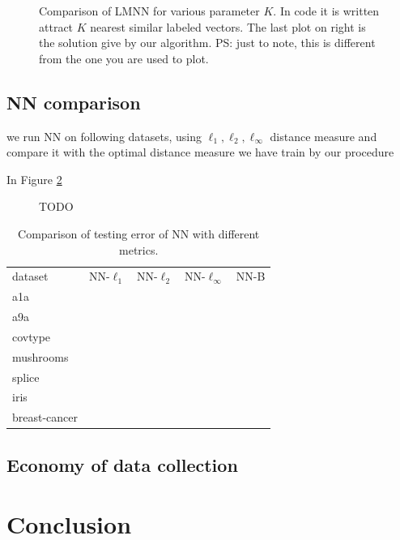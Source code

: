 \documentclass{article}
\begin{document}
\begin{figure}[h!]
\caption{Comparison of LMNN for various parameter $K$.
In code it is written 
 attract $K$ nearest similar labeled vectors. 
 The last plot on right is the solution give by our algorithm. 
 PS: just to note, this is different from the one you are used to plot.
}
\label{fig:synthetic}
\end{figure}

\clearpage
\subsection{NN comparison}

we run NN
on following datasets, using 
$\ell_1, \ell_2, \ell_\infty$ distance measure
and compare it with the optimal distance measure we have train by our procedure


In Figure \ref{fig:NN-exp}
\begin{figure}[h!]

\caption{TODO}
\label{fig:NN-exp}


\end{figure}




\begin{table}[h!]
\caption{Comparison of testing error of NN with different metrics.}
\label{tbl:BD-NN}
\begin{tabular}{l|r|r|r|r}
dataset & NN-$\ell_1$ 
		& NN-$\ell_2$
		& NN-$\ell_\infty$
        & NN-B
\\        
a1a
\\
a9a
\\
covtype
\\
mushrooms
\\
splice
\\
iris
\\
breast-cancer
\end{tabular}



\end{table}









\clearpage

\subsection{Economy of data collection}


\clearpage 
\section{Conclusion} 
 
\end{document}
